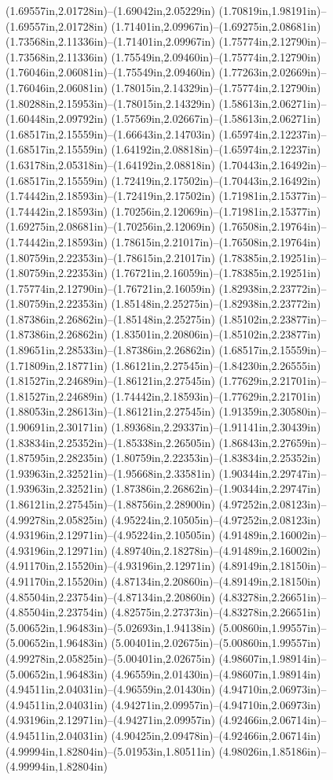 (1.69557in,2.01728in)--(1.69042in,2.05229in) (1.70819in,1.98191in)--(1.69557in,2.01728in) (1.71401in,2.09967in)--(1.69275in,2.08681in) (1.73568in,2.11336in)--(1.71401in,2.09967in) (1.75774in,2.12790in)--(1.73568in,2.11336in) (1.75549in,2.09460in)--(1.75774in,2.12790in) (1.76046in,2.06081in)--(1.75549in,2.09460in) (1.77263in,2.02669in)--(1.76046in,2.06081in) (1.78015in,2.14329in)--(1.75774in,2.12790in) (1.80288in,2.15953in)--(1.78015in,2.14329in) (1.58613in,2.06271in)--(1.60448in,2.09792in) (1.57569in,2.02667in)--(1.58613in,2.06271in) (1.68517in,2.15559in)--(1.66643in,2.14703in) (1.65974in,2.12237in)--(1.68517in,2.15559in) (1.64192in,2.08818in)--(1.65974in,2.12237in) (1.63178in,2.05318in)--(1.64192in,2.08818in) (1.70443in,2.16492in)--(1.68517in,2.15559in) (1.72419in,2.17502in)--(1.70443in,2.16492in) (1.74442in,2.18593in)--(1.72419in,2.17502in) (1.71981in,2.15377in)--(1.74442in,2.18593in) (1.70256in,2.12069in)--(1.71981in,2.15377in) (1.69275in,2.08681in)--(1.70256in,2.12069in) (1.76508in,2.19764in)--(1.74442in,2.18593in) (1.78615in,2.21017in)--(1.76508in,2.19764in) (1.80759in,2.22353in)--(1.78615in,2.21017in) (1.78385in,2.19251in)--(1.80759in,2.22353in) (1.76721in,2.16059in)--(1.78385in,2.19251in) (1.75774in,2.12790in)--(1.76721in,2.16059in) (1.82938in,2.23772in)--(1.80759in,2.22353in) (1.85148in,2.25275in)--(1.82938in,2.23772in) (1.87386in,2.26862in)--(1.85148in,2.25275in) (1.85102in,2.23877in)--(1.87386in,2.26862in) (1.83501in,2.20806in)--(1.85102in,2.23877in) (1.89651in,2.28533in)--(1.87386in,2.26862in) (1.68517in,2.15559in)--(1.71809in,2.18771in) (1.86121in,2.27545in)--(1.84230in,2.26555in) (1.81527in,2.24689in)--(1.86121in,2.27545in) (1.77629in,2.21701in)--(1.81527in,2.24689in) (1.74442in,2.18593in)--(1.77629in,2.21701in) (1.88053in,2.28613in)--(1.86121in,2.27545in) (1.91359in,2.30580in)--(1.90691in,2.30171in) (1.89368in,2.29337in)--(1.91141in,2.30439in) (1.83834in,2.25352in)--(1.85338in,2.26505in) (1.86843in,2.27659in)--(1.87595in,2.28235in) (1.80759in,2.22353in)--(1.83834in,2.25352in) (1.93963in,2.32521in)--(1.95668in,2.33581in) (1.90344in,2.29747in)--(1.93963in,2.32521in) (1.87386in,2.26862in)--(1.90344in,2.29747in) (1.86121in,2.27545in)--(1.88756in,2.28900in) (4.97252in,2.08123in)--(4.99278in,2.05825in) (4.95224in,2.10505in)--(4.97252in,2.08123in) (4.93196in,2.12971in)--(4.95224in,2.10505in) (4.91489in,2.16002in)--(4.93196in,2.12971in) (4.89740in,2.18278in)--(4.91489in,2.16002in) (4.91170in,2.15520in)--(4.93196in,2.12971in) (4.89149in,2.18150in)--(4.91170in,2.15520in) (4.87134in,2.20860in)--(4.89149in,2.18150in) (4.85504in,2.23754in)--(4.87134in,2.20860in) (4.83278in,2.26651in)--(4.85504in,2.23754in) (4.82575in,2.27373in)--(4.83278in,2.26651in) (5.00652in,1.96483in)--(5.02693in,1.94138in) (5.00860in,1.99557in)--(5.00652in,1.96483in) (5.00401in,2.02675in)--(5.00860in,1.99557in) (4.99278in,2.05825in)--(5.00401in,2.02675in) (4.98607in,1.98914in)--(5.00652in,1.96483in) (4.96559in,2.01430in)--(4.98607in,1.98914in) (4.94511in,2.04031in)--(4.96559in,2.01430in) (4.94710in,2.06973in)--(4.94511in,2.04031in) (4.94271in,2.09957in)--(4.94710in,2.06973in) (4.93196in,2.12971in)--(4.94271in,2.09957in) (4.92466in,2.06714in)--(4.94511in,2.04031in) (4.90425in,2.09478in)--(4.92466in,2.06714in) (4.99994in,1.82804in)--(5.01953in,1.80511in) (4.98026in,1.85186in)--(4.99994in,1.82804in) 